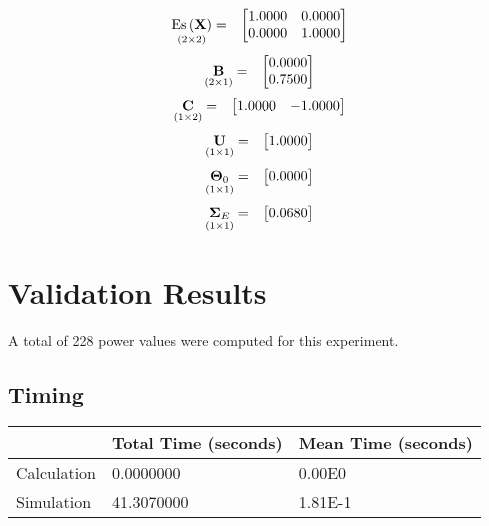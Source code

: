 \documentclass{glimmpse-report}
\begin{document}
\begin{eqnarray*}
\underset{\left(2\times2\right)}{\text{Es}\left(\mathbf{X}\right)} & = & \begin{bmatrix}1.0000 & 0.0000\protect\\
0.0000 & 1.0000\protect\\
\end{bmatrix}
\end{eqnarray*}
\begin{eqnarray*}
\underset{\left(2\times1\right)}{\mathbf{B}} & = & \begin{bmatrix}0.0000\protect\\
0.7500\protect\\
\end{bmatrix}
\end{eqnarray*}
\begin{eqnarray*}
\underset{\left(1\times2\right)}{\mathbf{C}} & = & \begin{bmatrix}1.0000 & -1.0000\protect\\
\end{bmatrix}
\end{eqnarray*}
\begin{eqnarray*}
\underset{\left(1\times1\right)}{\mathbf{U}} & = & \begin{bmatrix}1.0000\protect\\
\end{bmatrix}
\end{eqnarray*}
\begin{eqnarray*}
\underset{\left(1\times1\right)}{\mathbf{\Theta}_0} & = & \begin{bmatrix}0.0000\protect\\
\end{bmatrix}
\end{eqnarray*}
\begin{eqnarray*}
\underset{\left(1\times1\right)}{\mathbf{\Sigma}_E} & = & \begin{bmatrix}0.0680\protect\\
\end{bmatrix}
\end{eqnarray*}
\section{Validation Results}
A total of 228 power values were computed for this experiment.

\subsection{Timing}
\begin{tabular}{|l|l|l|}
\hline
 & Total Time (seconds) & Mean Time (seconds) \\ 
\hline
Calculation & 0.0000000 & 0.00E0\tabularnewline
\hline
Simulation & 41.3070000 & 1.81E-1\tabularnewline
\hline
\end{tabular}
\end{document}

